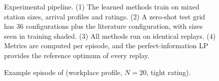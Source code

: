 \begin{figure}[t]
\centering
{}
\caption{Experimental pipeline. (1) The learned methods train on mixed station sizes, arrival profiles and ratings. (2) A zero-shot test grid has 36 configurations plus the literature configuration, with sizes seen in training shaded. (3) All methods run on identical replays. (4) Metrics are computed per episode, and the perfect-information LP provides the reference optimum of every replay.}
\label{fig:pipeline}
\end{figure}

\begin{figure}[t]
\centering
{}
\caption{Example episode of \method{} (workplace profile, $N=20$, tight rating).}
\label{fig:exampleday}
\end{figure}
